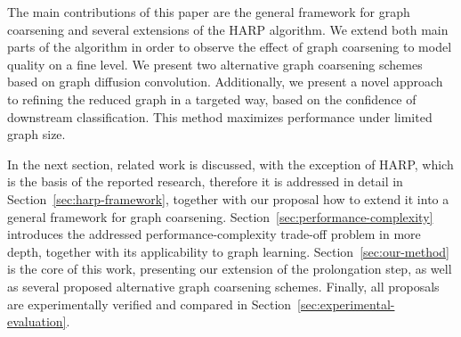 The main contributions of this paper are the general framework for graph coarsening and several extensions of the HARP algorithm. We extend both main parts of the algorithm in order to observe the effect of graph coarsening to model quality on a fine level. We present two alternative graph coarsening schemes based on graph diffusion convolution. Additionally, we present a novel approach to refining the reduced graph in a targeted way, based on the confidence of downstream classification. This method maximizes performance under limited graph size.

In the next section, related work is discussed, with the exception of HARP, which is the basis of the reported research, therefore it is addressed in detail in Section~\ref{sec:harp-framework}, together with our proposal how to extend it into a general framework for graph coarsening. Section~\ref{sec:performance-complexity} introduces the addressed performance-complexity trade-off problem in more depth, together with its applicability to graph learning. Section~\ref{sec:our-method} is the core of this work, presenting our extension of the prolongation step, as well as several proposed alternative graph coarsening schemes. Finally, all proposals are experimentally verified and compared in Section~\ref{sec:experimental-evaluation}.
